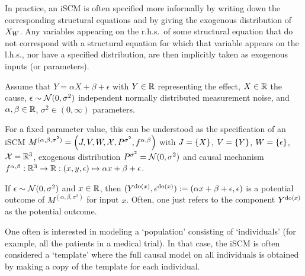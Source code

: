 In practice, an iSCM is often specified more informally by writing down the corresponding structural
equations and by giving the exogenous distribution of $X_{W}$. 
Any variables appearing
on the r.h.s.\ of some structural equation that do not correspond with a structural equation for which
that variable appears on the l.h.s., nor have a specified distribution, are then implicitly taken as
exogenous inputs (or parameters).
\begin{Eg}\label{eg:iscm_linear_regression_fixed_design-population}
  Assume that $Y = \alpha X + \beta + \epsilon$ with $Y \in \mathbb{R}$ representing the effect, $X \in \mathbb{R}$
  the cause, $\epsilon \sim \mathcal{N}(0,\sigma^2)$ independent normally distributed measurement noise, and
  $\alpha,\beta \in \mathbb{R}$, $\sigma^2 \in (0,\infty)$ parameters.

  For a fixed parameter value, this can be understood as the specification of an iSCM
  $M^{(\alpha,\beta,\sigma^2)} = \left ( J, V, W, \mathcal{X}, P^{\sigma^2}, f^{\alpha,\beta} \right )$ 
  with $J = \{X\}$, $V = \{Y\}$, $W = \{\epsilon\}$, $\mathcal{X} = \mathbb{R}^3$, 
  exogenous distribution $P^{\sigma^2} = \mathcal{N}(0,\sigma^2)$
  and causal mechanism $f^{\alpha,\beta} : \mathbb{R}^3 \to \mathbb{R} : (x,y,\epsilon) \mapsto \alpha x + \beta + \epsilon$.

  If $\epsilon \sim \mathcal{N}(0,\sigma^2)$ and $x \in \mathbb{R}$, then $(Y^{\operatorname{do}(x)},\epsilon^{\operatorname{do}(x)}) := (\alpha x + \beta + \epsilon, \epsilon)$ is
  a potential outcome of $M^{(\alpha,\beta,\sigma^2)}$ for input $x$. 
  Often, one just refers to the component $Y^{\operatorname{do}(x)}$ as the potential outcome.
\end{Eg}
One often is interested in modeling a `population' consisting of `individuals' (for example, all the patients in a medical trial).
In that case, the iSCM is often considered a `template' where the full causal model on all individuals is obtained by
making a copy of the template for each individual.

